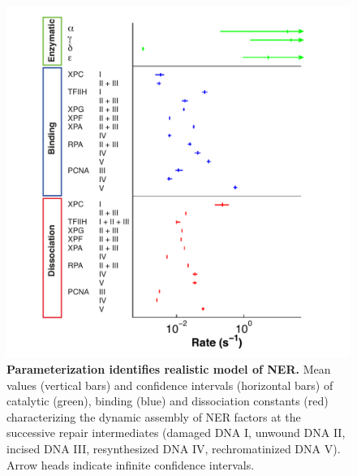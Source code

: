 \begin{figure}[htbp]
	\begin{center}
		\includegraphics[width=1\textwidth]{Abbildungen/figure2_9.pdf}
		\caption{\textbf{Parameterization identifies realistic model of NER.} Mean values (vertical bars) and confidence intervals (horizontal bars) of catalytic (green), binding (blue) and dissociation constants (red) characterizing the dynamic assembly of NER factors at the successive repair intermediates (damaged DNA I, unwound DNA II, incised DNA III, resynthesized DNA IV, rechromatinized DNA V). Arrow heads indicate infinite confidence intervals.}
		\label{fig:PLE_NER_overview}
	\end{center}
\end{figure}

